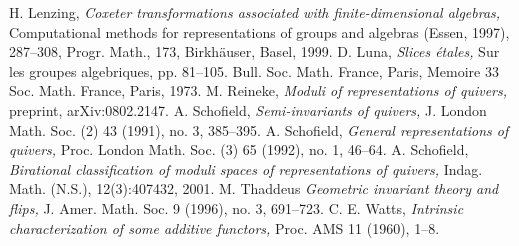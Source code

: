 \documentclass{amsart}
\theoremstyle{definition}
\theoremstyle{remark}
\numberwithin{equation}{section}
\begin{document}
\begin{thebibliography}{19}
 H. Lenzing, \textit{Coxeter transformations associated with finite-dimensional algebras,} Computational methods for representations of groups and algebras (Essen, 1997), 287--308, Progr. Math., 173, Birkh\"{a}user, Basel, 1999.
 D. Luna, \textit{Slices \'{e}tales,} Sur les groupes algebriques, pp. 81--105. Bull. Soc. Math. France, Paris, Memoire 33 Soc. Math. France, Paris, 1973.
 M. Reineke, \textit{Moduli of representations of quivers,} preprint, arXiv:0802.2147.
 A. Schofield, \textit{Semi-invariants of quivers,} J. London Math. Soc. (2) 43 (1991), no. 3, 385--395.
  A. Schofield, \textit{General representations of quivers,} Proc. London Math. Soc. (3) 65 (1992), no. 1, 46--64.
 A. Schofield, \textit{Birational classification of moduli spaces of representations of quivers,} Indag. Math. (N.S.), 12(3):407432, 2001.
 M. Thaddeus \textit{Geometric invariant theory and flips,} J. Amer. Math. Soc. 9 (1996), no. 3, 691--723.
 C. E. Watts, \textit{Intrinsic characterization of some additive functors,} Proc. AMS 11 (1960), 1--8.

\end{thebibliography}
\end{document}
